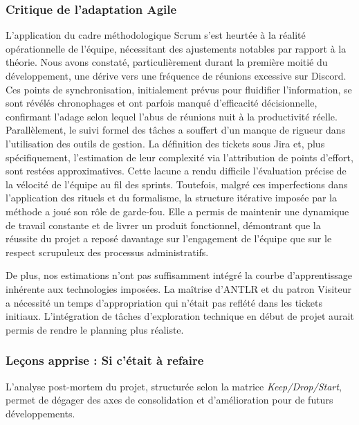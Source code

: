 \subsubsection{Critique de l'adaptation Agile}

L'application du cadre méthodologique Scrum s'est heurtée à la réalité opérationnelle de l'équipe, nécessitant des ajustements notables par rapport à la théorie. Nous avons constaté, particulièrement durant la première moitié du développement, une dérive vers une fréquence de réunions excessive sur Discord. Ces points de synchronisation, initialement prévus pour fluidifier l'information, se sont révélés chronophages et ont parfois manqué d'efficacité décisionnelle, confirmant l'adage selon lequel l'abus de réunions nuit à la productivité réelle.\\

Parallèlement, le suivi formel des tâches a souffert d'un manque de rigueur dans l'utilisation des outils de gestion. La définition des tickets sous Jira et, plus spécifiquement, l'estimation de leur complexité via l'attribution de points d'effort, sont restées approximatives. Cette lacune a rendu difficile l'évaluation précise de la vélocité de l'équipe au fil des sprints. Toutefois, malgré ces imperfections dans l'application des rituels et du formalisme, la structure itérative imposée par la méthode a joué son rôle de garde-fou. Elle a permis de maintenir une dynamique de travail constante et de livrer un produit fonctionnel, démontrant que la réussite du projet a reposé davantage sur l'engagement de l'équipe que sur le respect scrupuleux des processus administratifs.\newline

De plus, nos estimations n'ont pas suffisamment intégré la courbe d'apprentissage  inhérente aux technologies imposées. La maîtrise d'ANTLR et du patron Visiteur a nécessité un temps d'appropriation qui n'était pas reflété dans les tickets initiaux. L'intégration de tâches d'exploration technique en début de projet aurait permis de rendre le planning plus réaliste.

\subsubsection{Leçons apprise : Si c'était à refaire}

L'analyse post-mortem du projet, structurée selon la matrice \textit{Keep/Drop/Start}, permet de dégager des axes de consolidation et d'amélioration pour de futurs développements.\\

